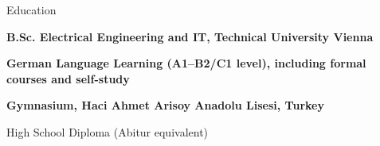 \begin{rubric}{Education}

%
	\textbf{B.Sc. Electrical Engineering and IT, Technical University Vienna}
% 
\vspace{4px}

%
        \textbf{German Language Learning (A1–B2/C1 level), including formal courses and self-study}

\vspace{4px}
%
	\textbf{Gymnasium, Haci Ahmet Arisoy Anadolu Lisesi, Turkey}
 
    
	\par High School Diploma (Abitur equivalent)
 
    
\end{rubric}